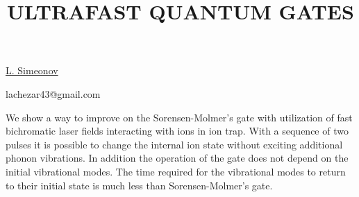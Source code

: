 \title{ULTRAFAST QUANTUM GATES}

\underline{L. Simeonov} 

{\normalsize{\vspace{-4mm}

\unisofia

\email lachezar43@gmail.com}}

We show a way to improve on the Sorensen-Molmer's gate with utilization of fast bichromatic laser fields interacting with ions in ion trap. With a sequence of two pulses it is possible to change the internal ion state without exciting additional phonon vibrations. In addition the operation of the gate does not depend on the initial vibrational modes. The time required for the vibrational modes to return to their initial state is much less than Sorensen-Molmer's gate.

\vspace{\baselineskip}
